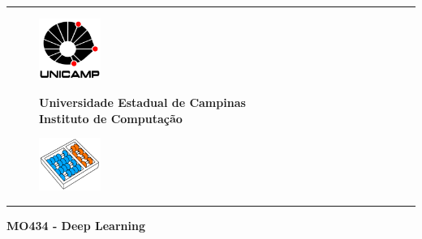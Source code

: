 \documentclass[11pt,letter]{report}
\begin{document}
	
	\sloppy
	
	\thispagestyle{empty}
	
	\begin{center}
		\rule{\textwidth}{1pt}
	\end{center}
	
	\vspace*{-0.2cm}
	
	\begin{figure}[!ht]
		\begin{minipage}[b]{2.3cm}
			\centering
			\hspace*{0.4cm}
			\includegraphics[width=2.0cm]{./fig/logo-unicamp-name-line-blk-red-0480-eps-converted-to.pdf}
		\end{minipage}
		\begin{minipage}[b]{11.1cm}
			\centering
			\hspace*{0.4cm}
			{\large \bf Universidade Estadual de Campinas} \\[0.2cm]
			{\large \bf Instituto de Computação}
		\end{minipage}
		\begin{minipage}[b]{2.3cm}
			\centering
			\hspace*{0.4cm}
			\includegraphics[width=2.0cm]{./fig/logo-ic-unicamp-slant-line-wht-sky-ora-0480-eps-converted-to.pdf}
		\end{minipage}
	\end{figure}
	
	\vspace*{-0.2cm}
	
	\begin{center}
		\rule{\textwidth}{1pt}
	\end{center}
	
	\vspace*{0.1cm}
	
	\begin{spacing}{1.2}
		\begin{center}
			{\Large \bf MO434 - Deep Learning}
			\\ [0.5cm]
		\end{center}
	\end{spacing}
	
\end{document}
